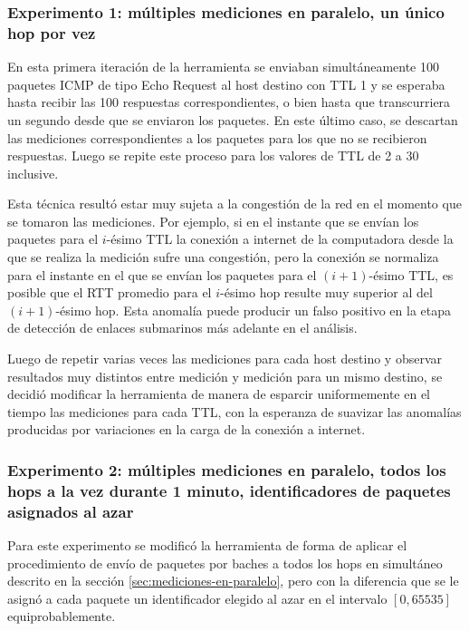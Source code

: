 \documentclass[a4paper, 10pt, twoside]{article}
\begin{document}
\subsubsection{Experimento 1: múltiples mediciones en paralelo, un único hop por vez}

En esta primera iteración de la herramienta se enviaban simultáneamente 100 paquetes ICMP de tipo Echo Request al host destino con TTL 1 y se esperaba hasta recibir las 100 respuestas correspondientes, o bien hasta que transcurriera un segundo desde que se enviaron los paquetes. En este último caso, se descartan las mediciones correspondientes a los paquetes para los que no se recibieron respuestas. Luego se repite este proceso para los valores de TTL de 2 a 30 inclusive.

Esta técnica resultó estar muy sujeta a la congestión de la red en el momento que se tomaron las mediciones. Por ejemplo, si en el instante que se envían los paquetes para el $i$-ésimo TTL la conexión a internet de la computadora desde la que se realiza la medición sufre una congestión, pero la conexión se normaliza para el instante en el que se envían los paquetes para el $(i+1)$-ésimo TTL, es posible que el RTT promedio para el $i$-ésimo hop resulte muy superior al del $(i+1)$-ésimo hop. Esta anomalía puede producir un falso positivo en la etapa de detección de enlaces submarinos más adelante en el análisis.

Luego de repetir varias veces las mediciones para cada host destino y observar resultados muy distintos entre medición y medición para un mismo destino, se decidió modificar la herramienta de manera de esparcir uniformemente en el tiempo las mediciones para cada TTL, con la esperanza de suavizar las anomalías producidas por variaciones en la carga de la conexión a internet.


\subsubsection{Experimento 2: múltiples mediciones en paralelo, todos los hops a la vez durante 1 minuto, identificadores de paquetes asignados al azar}

Para este experimento se modificó la herramienta de forma de aplicar el procedimiento de envío de paquetes por baches a todos los hops en simultáneo descrito en la sección \ref{sec:mediciones-en-paralelo}, pero con la diferencia que se le asignó a cada paquete un identificador elegido al azar en el intervalo $[0, 65535]$ equiprobablemente.
\end{document}

